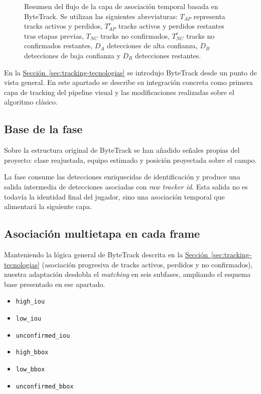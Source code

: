 \begin{figure}[H]
{\begin{tikzpicture}
\end{tikzpicture}
}%
\caption[Resumen del flujo de asociación en la capa ByteTrack]{Resumen del flujo de la capa de asociación temporal basada en ByteTrack. Se utilizan las siguientes abreviaturas: $T_{AP}$ representa tracks activos y perdidos, $T_{AP}^{r}$ tracks activos y perdidos restantes tras etapas previas, $T_{NC}$ tracks no confirmados, $T_{NC}^{r}$ tracks no confirmados restantes, $D_A$ detecciones de alta confianza, $D_B$ detecciones de baja confianza y $D_R$ detecciones restantes.}
\label{fig:bytetrack_resumen}
\end{figure}

En la \hyperref[sec:tracking-tecnologias]{Sección~\ref*{sec:tracking-tecnologias}} se introdujo ByteTrack desde un punto de vista general. En este apartado se describe su integración concreta como primera capa de tracking del pipeline visual y las modificaciones realizadas sobre el algoritmo clásico.

\subsection{Base de la fase}

Sobre la estructura original de ByteTrack se han añadido señales propias del proyecto: clase reajustada, equipo estimado y posición proyectada sobre el campo.

La fase consume las detecciones enriquecidas de identificación y produce una salida intermedia de detecciones asociadas con \textit{raw tracker id}. Esta salida no es todavía la identidad final del jugador, sino una asociación temporal que alimentará la siguiente capa.

\subsection{Asociación multietapa en cada frame}

Manteniendo la lógica general de ByteTrack descrita en la \hyperref[sec:tracking-tecnologias]{Sección~\ref*{sec:tracking-tecnologias}} (asociación progresiva de tracks activos, perdidos y no confirmados), nuestra adaptación desdobla el \textit{matching} en seis subfases, ampliando el esquema base presentado en ese apartado.
\begin{itemize}
    \item \texttt{high\_iou}
    \item \texttt{low\_iou}
    \item \texttt{unconfirmed\_iou}
    \item \texttt{high\_bbox}
    \item \texttt{low\_bbox}
    \item \texttt{unconfirmed\_bbox}
\end{itemize}

